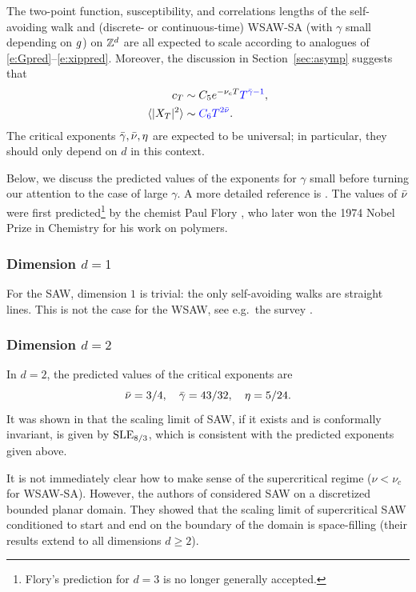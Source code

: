 The two-point function, susceptibility, and correlations lengths of the
self-avoiding walk and (discrete- or continuous-time) WSAW-SA (with $\gamma$ small
depending on $g$) on ${ {{\mathbb Z}}^d }$ are all expected
to scale according to analogues of \eqref{e:Gpred}--\eqref{e:xippred}.
Moreover, the discussion in Section~\ref{sec:asymp} suggests that
\begin{align}
\label{e:cT-asymp}
c_T                       &\sim C_5 e^{-\nu_c T} {\color{blue} T^{\bar\gamma-1}}, \\
\label{e:XT-asymp}
\langle |X_T|^2 \rangle   &\sim {\color{blue}C_6 T^{2\bar\nu}}.
\end{align}
The critical exponents $\bar\gamma, \bar\nu, \eta$ are expected to be universal;
in particular, they should only depend on $d$ in this context.

Below, we discuss the predicted values of the exponents for $\gamma$ small before
turning our attention to the case of large $\gamma$. A more detailed reference is
\cite{MS93}. The values of $\bar\nu$ were first predicted\footnote{Flory's prediction
for $d = 3$ is no longer generally accepted.} by the chemist Paul Flory \cite{Flor49}, who
later won the 1974 Nobel Prize in Chemistry for his work on polymers.

\subsubsection{Dimension $d = 1$}

For the SAW, dimension $1$ is trivial: the only self-avoiding walks are straight
lines. This is not the case for the WSAW, see e.g.\ the survey \cite{HK01}.

\subsubsection{Dimension $d = 2$}

In $d = 2$, the predicted values of the critical exponents are
\begin{equation}
\bar\nu = 3/4, \quad \bar\gamma = 43/32, \quad \eta = 5/24.
\end{equation}
It was shown in \cite{LSW04} that the scaling limit of SAW, if it exists and
is conformally invariant, is given by ${\rm SLE}_{8/3}$, which is consistent with
the predicted exponents given above.

It is not immediately clear how to make sense of the supercritical regime
($\nu < \nu_c$ for WSAW-SA).
However, the authors of \cite{LSW04} considered SAW on a discretized bounded
planar domain. They showed that the scaling limit of supercritical
SAW conditioned to start and end on the boundary of the domain is space-filling
(their results extend to all dimensions $d \ge 2$).

